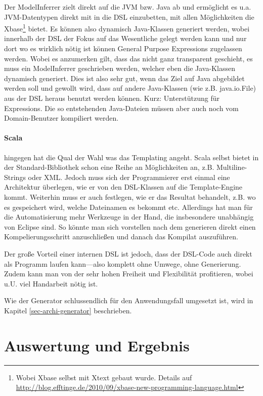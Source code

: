 Der ModelInferrer zielt direkt auf die JVM bzw. Java ab und ermöglicht es
u.a. JVM-Datentypen direkt mit in die DSL einzubetten, mit allen Möglichkeiten
die Xbase\footnote{ Wobei Xbase selbst mit Xtext gebaut wurde.
Details auf
\url{http://blog.efftinge.de/2010/09/xbase-new-programming-language.html}}
bietet. Es können also dynamisch Java-Klassen generiert werden, wobei innerhalb
der DSL der Fokus auf das Wesentliche gelegt werden kann und nur dort wo es
wirklich nötig ist können General Purpose Expressions zugelassen werden.
Wobei es anzumerken gilt, dass das nicht ganz transparent geschieht,
es muss ein ModelInferrer geschrieben werden, welcher eben die Java-Klassen
dynamisch generiert.
Dies ist also sehr gut, wenn das Ziel auf Java abgebildet werden soll
und gewollt wird, dass auf andere Java-Klassen (wie z.B. java.io.File)
aus der DSL heraus benutzt werden können. Kurz: Unterstützung für Expressions.
Die so entstehenden Java-Dateien müssen aber auch noch vom Domain-Benutzer
kompiliert werden.\cite{xtext}

\paragraph{Scala} hingegen hat die Qual der Wahl was das Templating angeht.
Scala selbst bietet in der Standard-Bibliothek schon
eine Reihe an Möglichkeiten an,
z.B. Multiline-Strings oder XML. Jedoch muss sich der Programmierer erst einmal
eine Architektur überlegen, wie er von den DSL-Klassen auf die Template-Engine
kommt. Weiterhin muss er auch festlegen, wie er das Resultat behandelt,
z.B. wo es gespeichert wird, welche Dateinamen es bekommt etc.
Allerdings hat man für die Automatisierung mehr Werkzeuge in der Hand,
die insbesondere unabhängig von Eclipse sind. So könnte man sich vorstellen
nach dem generieren direkt einen Kompelierungsschritt anzuschließen und
danach das Kompilat auszuführen.

Der große Vorteil einer internen DSL ist jedoch, dass der DSL-Code auch
direkt als Programm laufen kann---also komplett ohne Umwege, ohne Generierung.
Zudem kann man von der sehr hohen Freiheit und Flexibilität profitieren,
wobei u.U. viel Handarbeit nötig ist.

Wie der Generator schlussendlich für den Anwendungsfall umgesetzt ist,
wird in Kapitel \ref{sec-archi-generator} beschrieben.

\section{Auswertung und Ergebnis}\label{sec-auswertung}

